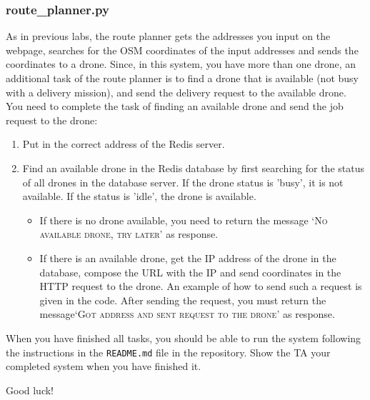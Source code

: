 \documentclass{article}
\begin{document}
\subsubsection{route\_planner.py}
As in previous labs, the route planner gets the addresses you input on the webpage, searches for the OSM coordinates of the input addresses and sends the coordinates to a drone. Since, in this system, you have more than one drone, an additional task of the route planner is to find a drone that is available (not busy with a delivery mission), and send the delivery request to the available drone. You need to complete the task of finding an available drone and send the job request to the drone:
\begin{enumerate}
    \item Put in the correct address of the Redis server.
    \item Find an available drone in the Redis database by first searching for the status of all drones in the database server. If the drone status is 'busy', it is not available. If the status is 'idle', the drone is available.
    \begin{itemize}
        \item If there is no drone available, you need to return the message {\textsc{`No available drone, try later'}} as response.
        \item If there is an available drone, get the IP address of the drone in the database, compose the URL with the IP and send coordinates in the HTTP request to the drone. An example of how to send such a request is given in the code. After sending the request, you must return the message\textsc{`Got address and sent request to the drone'} as response.
    \end{itemize}
\end{enumerate}

When you have finished all tasks, you should be able to run the system following the instructions in the \texttt{README.md} file in the repository. Show the TA your completed system when you have finished it.

\vspace{1cm}
\begin{center}
\huge Good luck!
\end{center}
\end{document}

